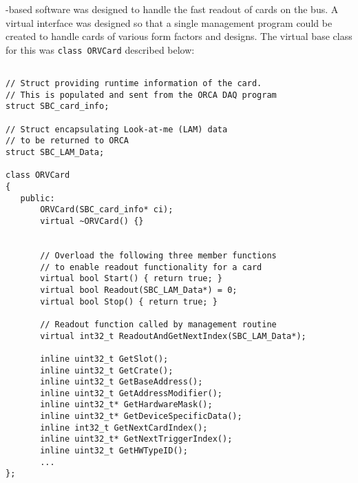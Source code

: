 \cpp-based software was designed to handle the fast readout of cards on the bus.  A virtual interface was
designed so that a single management program could be created to handle cards of various form factors and designs. 
The virtual base class for this was \lstinline!class ORVCard! described below:
			\begin{lstlisting}

// Struct providing runtime information of the card.
// This is populated and sent from the ORCA DAQ program 
struct SBC_card_info;

// Struct encapsulating Look-at-me (LAM) data 
// to be returned to ORCA 
struct SBC_LAM_Data;

class ORVCard 
{
   public:
       ORVCard(SBC_card_info* ci); 
       virtual ~ORVCard() {} 

      
	   // Overload the following three member functions 
       // to enable readout functionality for a card
       virtual bool Start() { return true; }
       virtual bool Readout(SBC_LAM_Data*) = 0;  
       virtual bool Stop() { return true; }

       // Readout function called by management routine 
       virtual int32_t ReadoutAndGetNextIndex(SBC_LAM_Data*);  

       inline uint32_t GetSlot();
       inline uint32_t GetCrate();
       inline uint32_t GetBaseAddress();
       inline uint32_t GetAddressModifier(); 
       inline uint32_t* GetHardwareMask();
       inline uint32_t* GetDeviceSpecificData();
       inline int32_t GetNextCardIndex();
       inline uint32_t* GetNextTriggerIndex();
       inline uint32_t GetHWTypeID();
       ...
};
			\end{lstlisting}

